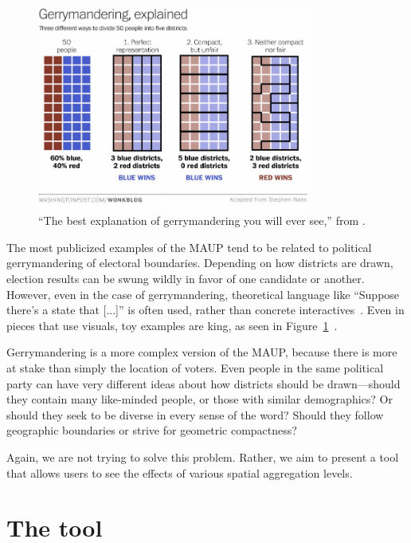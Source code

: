 \documentclass{article}\usepackage[]{graphicx}\usepackage[]{color}
\begin{document}
\begin{figure}[htbp]
\begin{centering}
\includegraphics[width=0.8\textwidth]{../img/gerrymandering}
\caption{``The best explanation of gerrymandering you will ever see,'' from \cite{Ing2015}.}\label{gerrymandering}
\end{centering}
\end{figure}


The most publicized examples of the MAUP tend to be related to political gerrymandering of electoral boundaries. Depending on how districts are drawn, election results can be swung wildly in favor of one candidate or another. However, even in the case of gerrymandering, theoretical language like ``Suppose there's a state that [...]'' is often used, rather than concrete interactives~\citep{Coh2015}. Even in pieces that use visuals, toy examples are king, as seen in Figure~\ref{gerrymandering}~\citep{Ing2015}.


Gerrymandering is a more complex version of the MAUP, because there is more at stake than simply the location of voters. Even people in the same political party can have very different ideas about how districts should be drawn---should they contain many like-minded people, or those with similar demographics? Or should they seek to be diverse in every sense of the word? Should they follow geographic boundaries or strive for geometric compactness? 

Again, we are not trying to solve this problem. Rather, we aim to present a tool that allows users to see the effects of various spatial aggregation levels.


\section{The tool}
\end{document}
